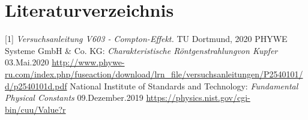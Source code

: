 \documentclass[titlepage = firstcover]{scrartcl}
\begin{document}
    \newpage
    \section{Literaturverzeichnis}
            [1] \textit{Versuchsanleitung V603 - Compton-Effekt.} TU Dortmund, 2020 \newline
            [2] PHYWE Systeme GmbH \& Co. KG: \textit{Charakteristische Röntgenstrahlungvon Kupfer} 03.Mai.2020
                \url{http://www.phywe-ru.com/index.php/fuseaction/download/lrn_file/versuchsanleitungen/P2540101/d/p2540101d.pdf} \newline
            [2] National Institute of Standards and Technology: \textit{Fundamental Physical Constants} 09.Dezember.2019
                \url{https://physics.nist.gov/cgi-bin/cuu/Value?r}

    \newpage
    
\end{document}
